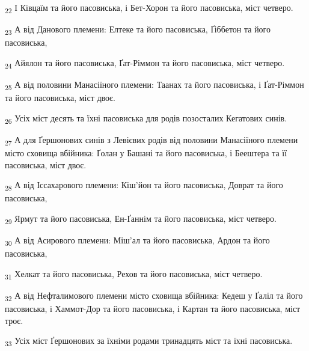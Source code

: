 \begin{tcolorbox}
\textsubscript{22} І Ківцаїм та його пасовиська, і Бет-Хорон та його пасовиська, міст четверо.
\end{tcolorbox}
\begin{tcolorbox}
\textsubscript{23} А від Данового племени: Елтеке та його пасовиська, Ґіббетон та його пасовиська,
\end{tcolorbox}
\begin{tcolorbox}
\textsubscript{24} Айялон та його пасовиська, Ґат-Ріммон та його пасовиська, міст четверо.
\end{tcolorbox}
\begin{tcolorbox}
\textsubscript{25} А від половини Манасіїного племени: Таанах та його пасовиська, і Ґат-Ріммон та його пасовиська, міст двоє.
\end{tcolorbox}
\begin{tcolorbox}
\textsubscript{26} Усіх міст десять та їхні пасовиська для родів позосталих Кегатових синів.
\end{tcolorbox}
\begin{tcolorbox}
\textsubscript{27} А для Ґершонових синів з Левієвих родів від половини Манасіїного племени місто сховища вбійника: Ґолан у Башані та його пасовиська, і Беештера та її пасовиська, міст двоє.
\end{tcolorbox}
\begin{tcolorbox}
\textsubscript{28} А від Іссахарового племени: Кіш'йон та його пасовиська, Доврат та його пасовиська,
\end{tcolorbox}
\begin{tcolorbox}
\textsubscript{29} Ярмут та його пасовиська, Ен-Ґаннім та його пасовиська, міст четверо.
\end{tcolorbox}
\begin{tcolorbox}
\textsubscript{30} А від Асирового племени: Міш'ал та його пасовиська, Ардон та його пасовиська,
\end{tcolorbox}
\begin{tcolorbox}
\textsubscript{31} Хелкат та його пасовиська, Рехов та його пасовиська, міст четверо.
\end{tcolorbox}
\begin{tcolorbox}
\textsubscript{32} А від Нефталимового племени місто сховища вбійника: Кедеш у Ґаліл та його пасовиська, і Хаммот-Дор та його пасовиська, і Картан та його пасовиська, міст троє.
\end{tcolorbox}
\begin{tcolorbox}
\textsubscript{33} Усіх міст Ґершонових за їхніми родами тринадцять міст та їхні пасовиська.
\end{tcolorbox}
